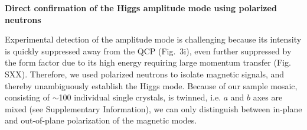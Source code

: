 \vspace{ 10 pt}
\noindent
{\bf Direct confirmation of the Higgs amplitude mode using polarized neutrons}

\noindent
Experimental detection of the amplitude mode is challenging because its intensity is quickly suppressed away from the QCP (Fig.~3i), even further suppressed by the form factor due to its high energy requiring large momentum transfer (Fig. SXX).  Therefore, we used polarized neutrons to isolate magnetic signals, and thereby unambiguously establish the Higgs mode. Because of our sample mosaic, consisting of $\sim$100 individual single crystals, is twinned, i.e. $a$ and $b$ axes are mixed (see Supplementary Information), we can only distinguish between in-plane and out-of-plane polarization of the magnetic modes.   